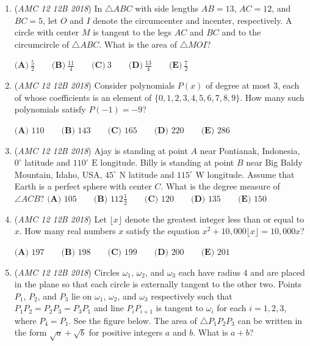 \begin{enumerate}
 $\textbf{(A)}\ \frac {3}{8}\sqrt{3} \qquad \textbf{(B)}\ \frac {7}{16}\sqrt{3} \qquad \textbf{(C)}\ \frac {15}{32}\sqrt{3} \qquad  \textbf{(D)}\ \frac {1}{2}\sqrt{3} \qquad \textbf{(E)}\ \frac {9}{16}\sqrt{3}$


	\item (\textit{AMC 12 12B 2018}) In $\triangle{ABC}$ with side lengths $AB = 13$, $AC = 12$, and $BC = 5$, let $O$ and $I$ denote the circumcenter and incenter, respectively. A circle with center $M$ is tangent to the legs $AC$ and $BC$ and to the circumcircle of $\triangle{ABC}$. What is the area of $\triangle{MOI}$?


 $\textbf{(A)}\ \frac52\qquad\textbf{(B)}\ \frac{11}{4}\qquad\textbf{(C)}\ 3\qquad\textbf{(D)}\ \frac{13}{4}\qquad\textbf{(E)}\ \frac72$


	\item (\textit{AMC 12 12B 2018}) Consider polynomials $P(x)$ of degree at most $3$, each of whose coefficients is an element of $\{0, 1, 2, 3, 4, 5, 6, 7, 8, 9\}$. How many such polynomials satisfy $P(-1) = -9$?


 $\textbf{(A) } 110 \qquad \textbf{(B) } 143 \qquad \textbf{(C) } 165 \qquad \textbf{(D) } 220 \qquad \textbf{(E) } 286$


	\item (\textit{AMC 12 12B 2018}) Ajay is standing at point $A$ near Pontianak, Indonesia, $0^\circ$ latitude and $110^\circ \text{ E}$ longitude. Billy is standing at point $B$ near Big Baldy Mountain, Idaho, USA, $45^\circ \text{ N}$ latitude and $115^\circ \text{ W}$ longitude. Assume that Earth is a perfect sphere with center $C.$ What is the degree measure of $\angle ACB?$
$\textbf{(A) }105 \qquad \textbf{(B) }112\frac{1}{2} \qquad \textbf{(C) }120 \qquad \textbf{(D) }135 \qquad \textbf{(E) }150 \qquad$


	\item (\textit{AMC 12 12B 2018}) Let $\lfloor x \rfloor$ denote the greatest integer less than or equal to $x$. How many real numbers $x$ satisfy the equation $x^2 + 10,000\lfloor x \rfloor = 10,000x$?


 $\textbf{(A) } 197 \qquad \textbf{(B) } 198 \qquad \textbf{(C) } 199 \qquad \textbf{(D) } 200 \qquad \textbf{(E) } 201$


	\item (\textit{AMC 12 12B 2018}) Circles $\omega_1$, $\omega_2$, and $\omega_3$ each have radius $4$ and are placed in the plane so that each circle is externally tangent to the other two.  Points $P_1$, $P_2$, and $P_3$ lie on $\omega_1$, $\omega_2$, and $\omega_3$ respectively such that $P_1P_2=P_2P_3=P_3P_1$ and line $P_iP_{i+1}$ is tangent to $\omega_i$ for each $i=1,2,3$, where $P_4 = P_1$.  See the figure below.  The area of $\triangle P_1P_2P_3$ can be written in the form $\sqrt{a}+\sqrt{b}$ for positive integers $a$ and $b$.  What is $a+b$?



\end{enumerate}
